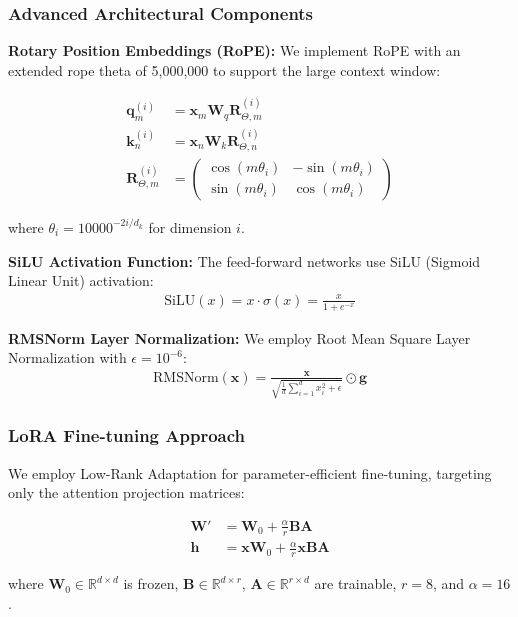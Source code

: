\subsubsection{Advanced Architectural Components}
\textbf{Rotary Position Embeddings (RoPE):} We implement RoPE with an extended rope theta of 5,000,000 to support the large context window:

\begin{align}
\mathbf{q}_m^{(i)} &= \mathbf{x}_m \mathbf{W}_q \mathbf{R}_{\Theta,m}^{(i)} \\
\mathbf{k}_n^{(i)} &= \mathbf{x}_n \mathbf{W}_k \mathbf{R}_{\Theta,n}^{(i)} \\
\mathbf{R}_{\Theta,m}^{(i)} &= \begin{pmatrix}
\cos(m\theta_i) & -\sin(m\theta_i) \\
\sin(m\theta_i) & \cos(m\theta_i)
\end{pmatrix}
\end{align}

where $\theta_i = 10000^{-2i/d_k}$ for dimension $i$.

\textbf{SiLU Activation Function:} The feed-forward networks use SiLU (Sigmoid Linear Unit) activation:
\begin{align}
\text{SiLU}(x) = x \cdot \sigma(x) = \frac{x}{1 + e^{-x}}
\end{align}

\textbf{RMSNorm Layer Normalization:} We employ Root Mean Square Layer Normalization with $\epsilon = 10^{-6}$:
\begin{align}
\text{RMSNorm}(\mathbf{x}) = \frac{\mathbf{x}}{\sqrt{\frac{1}{d} \sum_{i=1}^{d} x_i^2 + \epsilon}} \odot \mathbf{g}
\end{align}

\subsubsection{LoRA Fine-tuning Approach}
We employ Low-Rank Adaptation for parameter-efficient fine-tuning, targeting only the attention projection matrices:

\begin{align}
\mathbf{W}' &= \mathbf{W}_0 + \frac{\alpha}{r}\mathbf{B}\mathbf{A} \\
\mathbf{h} &= \mathbf{x}\mathbf{W}_0 + \frac{\alpha}{r}\mathbf{x}\mathbf{B}\mathbf{A}
\end{align}

where $\mathbf{W}_0 \in \mathbb{R}^{d \times d}$ is frozen, $\mathbf{B} \in \mathbb{R}^{d \times r}$, $\mathbf{A} \in \mathbb{R}^{r \times d}$ are trainable, $r = 8$, and $\alpha = 16$.

